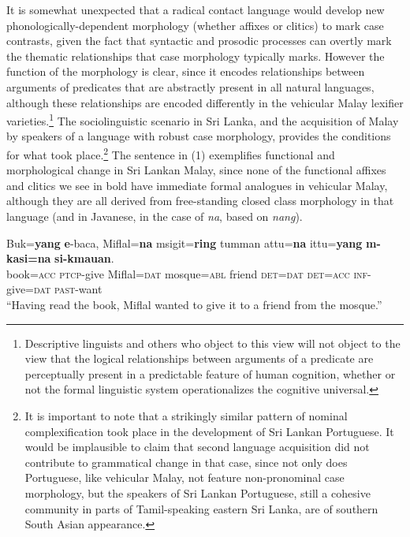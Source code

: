 It is somewhat unexpected that a radical contact language would develop new phonologically-dependent morphology (whether affixes or clitics) to mark case contrasts, given the fact that syntactic and prosodic processes can overtly mark the thematic relationships that case morphology typically marks. However the function of the morphology is clear, since it encodes relationships between arguments of predicates that are abstractly present in all natural languages, although these relationships are encoded differently in the vehicular Malay lexifier varieties.\footnote{Descriptive
  linguists and others who object to this view will not object to the view that the logical relationships between arguments of a predicate are perceptually present in a predictable feature of human cognition, whether or not the formal linguistic system operationalizes the cognitive universal.
} 
The sociolinguistic scenario in Sri Lanka, and the acquisition of Malay by speakers of a language with robust case morphology, provides the conditions for what took place.\footnote{It
  is important to note that a strikingly similar pattern of nominal complexification took place in the development of Sri Lankan Portuguese. It would be implausible to claim that second language acquisition did not contribute to grammatical change in that case, since not only does Portuguese, like vehicular Malay, not feature non-pronominal case morphology, but the speakers of Sri Lankan Portuguese, still a cohesive community in parts of Tamil-speaking eastern Sri Lanka, are of southern South Asian appearance.
} 
The sentence in (1) exemplifies functional and morphological change in Sri Lankan Malay, since none of the functional affixes and clitics we see in bold have immediate formal analogues in vehicular Malay, although they are all derived from free-standing closed class morphology in that language (and in Javanese, in the case of \textit{na}, based on \textit{nang}).

\ea
\gll Buk=\textbf{yang} \textbf{e}-baca,  Miflal=\textbf{na}  m{\textschwa}sigit=\textbf{ring} tumman attu=\textbf{na} ittu=\textbf{yang} \textbf{m}\textbf{{\textschwa}-kasi=na} \textbf{si-k{\textschwa}mauan}.\\
     book=\textsc{acc} \textsc{ptcp}-give Miflal=\textsc{dat} mosque=\textsc{abl}             friend  \textsc{det}=\textsc{dat} \textsc{det}=\textsc{acc} \textsc{inf}-give=\textsc{dat} \textsc{past}-want\\
 ``Having read the book, Miflal wanted to give it to a friend from the mosque.''
\z


